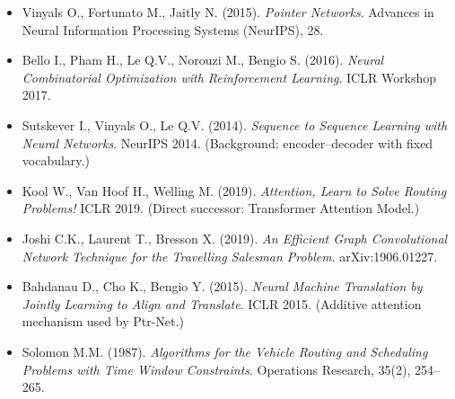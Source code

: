 \documentclass[12pt,a4paper]{article}
\begin{document}
\begin{itemize}[leftmargin=1.5em]
  \item Vinyals O., Fortunato M., Jaitly N. (2015).
    \textit{Pointer Networks}.
    Advances in Neural Information Processing Systems (NeurIPS), 28.
  \item Bello I., Pham H., Le Q.V., Norouzi M., Bengio S. (2016).
    \textit{Neural Combinatorial Optimization with Reinforcement Learning}.
    ICLR Workshop 2017.
  \item Sutskever I., Vinyals O., Le Q.V. (2014).
    \textit{Sequence to Sequence Learning with Neural Networks}.
    NeurIPS 2014.
    (Background: encoder--decoder with fixed vocabulary.)
  \item Kool W., Van Hoof H., Welling M. (2019).
    \textit{Attention, Learn to Solve Routing Problems!}
    ICLR 2019.
    (Direct successor: Transformer Attention Model.)
  \item Joshi C.K., Laurent T., Bresson X. (2019).
    \textit{An Efficient Graph Convolutional Network Technique for the
    Travelling Salesman Problem}.
    arXiv:1906.01227.
  \item Bahdanau D., Cho K., Bengio Y. (2015).
    \textit{Neural Machine Translation by Jointly Learning to Align and
    Translate}.
    ICLR 2015.
    (Additive attention mechanism used by Ptr-Net.)
  \item Solomon M.M. (1987).
    \textit{Algorithms for the Vehicle Routing and Scheduling Problems with
    Time Window Constraints}.
    Operations Research, 35(2), 254--265.
\end{itemize}
\end{document}
